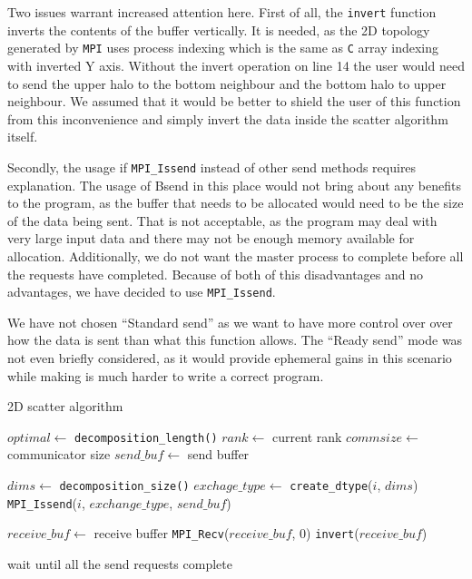 \documentclass[11pt,a4paper]{article}
\begin{document}
Two issues warrant increased attention here. First of all, the \texttt{invert} function inverts the contents of the buffer vertically. It is needed, as the 2D topology generated by \texttt{MPI} uses process indexing which is the same as \texttt{C} array indexing with inverted Y axis. Without the invert operation on line 14 the user would need to send the upper halo to the bottom neighbour and the bottom halo to upper neighbour. We assumed that it would be better to shield the user of this function from this inconvenience and simply invert the data inside the scatter algorithm itself. 

Secondly, the usage if \texttt{MPI\_Issend} instead of other send methods requires explanation. The usage of Bsend in this place would not bring about any benefits to the program, as the buffer that needs to be allocated would need to be the size of the data being sent. That is not acceptable, as the program may deal with very large input data and there may not be enough memory available for allocation. Additionally, we do not want the master process to complete before all the requests have completed. Because of both of this disadvantages and no advantages, we have decided to use \texttt{MPI\_Issend}.

We have not chosen ``Standard send'' as we want to have more control over over how the data is sent than what this function allows. The ``Ready send'' mode was not even briefly considered, as it would provide ephemeral gains in this scenario while making is much harder to write a correct program.
\begin{algorithm}
    \caption{2D scatter algorithm}\label{2dscat}
    \begin{algorithmic}[1]
        \State $optimal\gets$ \texttt{decomposition\_length()}
        \State $rank\gets$ current rank
        \State $commsize\gets$ communicator size
        \State $send\_buf\gets$ send buffer

        \State $dims\gets$ \texttt{decomposition\_size()}
                \State $exchage\_type\gets$ \texttt{create\_dtype}($i$, $dims$)
                \State \texttt{MPI\_Issend}($i$, $exchange\_type$, $send\_buf$)
            \EndFor
        \EndIf

        \State $receive\_buf\gets$ receive buffer
        \State \texttt{MPI\_Recv}($receive\_buf$, $0$)
        \State \texttt{invert}($receive\_buf$)

            wait until all the send requests complete
        \EndIf
    \end{algorithmic}
\end{algorithm}
\end{document}
